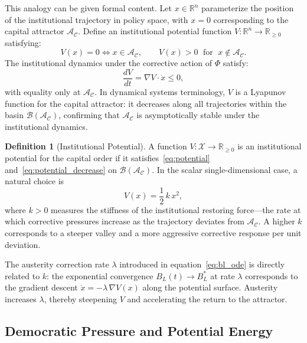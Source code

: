 \documentclass[12pt,a4paper]{article}
\theoremstyle{definition}
\newtheorem{definition}{Definition}[section]
\theoremstyle{remark}
\begin{document}
This analogy can be given formal content. Let $x \in \mathbb{R}^n$ parameterize the position of the institutional trajectory in policy space, with $x = 0$ corresponding to the capital attractor $\mathcal{A}_\mathcal{C}$. Define an institutional potential function $V : \mathbb{R}^n \to \mathbb{R}_{\geq 0}$ satisfying:
\begin{equation}
  \label{eq:potential}
  V(x) = 0 \iff x \in \mathcal{A}_\mathcal{C}, \qquad V(x) > 0 \;\text{ for }\; x \notin \mathcal{A}_\mathcal{C}.
\end{equation}
The institutional dynamics under the corrective action of $\Phi$ satisfy:
\begin{equation}
  \label{eq:potential_decrease}
  \frac{dV}{dt} = \nabla V \cdot \dot{x} \leq 0,
\end{equation}
with equality only at $\mathcal{A}_\mathcal{C}$. In dynamical systems terminology, $V$ is a Lyapunov function for the capital attractor: it decreases along all trajectories within the basin $\mathcal{B}(\mathcal{A}_\mathcal{C})$, confirming that $\mathcal{A}_\mathcal{C}$ is asymptotically stable under the institutional dynamics.

\begin{definition}[Institutional Potential]
A function $V : \mathcal{X} \to \mathbb{R}_{\geq 0}$ is an institutional potential for the capital order if it satisfies~\eqref{eq:potential} and~\eqref{eq:potential_decrease} on $\mathcal{B}(\mathcal{A}_\mathcal{C})$. In the scalar single-dimensional case, a natural choice is
\begin{equation}
  \label{eq:quadratic_potential}
  V(x) = \frac{1}{2}\,k\,x^2,
\end{equation}
where $k > 0$ measures the stiffness of the institutional restoring force---the rate at which corrective pressures increase as the trajectory deviates from $\mathcal{A}_\mathcal{C}$. A higher $k$ corresponds to a steeper valley and a more aggressive corrective response per unit deviation.
\end{definition}

The austerity correction rate $\lambda$ introduced in equation~\eqref{eq:bl_ode} is directly related to $k$: the exponential convergence $B_L(t) \to B_L^*$ at rate $\lambda$ corresponds to the gradient descent $\dot x = -\lambda\, \nabla V(x)$ along the potential surface. Austerity increases $\lambda$, thereby steepening $V$ and accelerating the return to the attractor.

\subsection{Democratic Pressure and Potential Energy}
\end{document}
